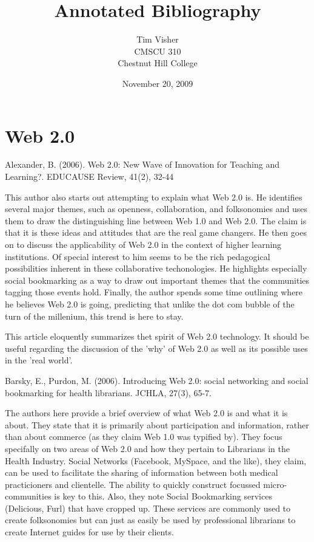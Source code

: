 \documentclass[12pt,oneside,letterpaper,titlepage]{article}
\author{Tim Visher\\ CMSCU 310\\ Chestnut Hill College}
\title{Annotated Bibliography}
\date{November 20, 2009}
\begin{document}
\maketitle

\section{Web 2.0}

Alexander, B. (2006). Web 2.0: New Wave of Innovation for Teaching and Learning?. EDUCAUSE Review, 41(2), 32-44

This author also starts out attempting to explain what Web 2.0 is.  He
identifies several major themes, such as openness, collaboration, and
folksonomies and uses them to draw the distinguishing line between Web 1.0 and
Web 2.0.  The claim is that it is these ideas and attitudes that are the real
game changers.  He then goes on to discuss the applicability of Web 2.0 in the
context of higher learning institutions.  Of special interest to him seems to be
the rich pedagogical possibilities inherent in these collaborative
techonologies.  He highlights especially social bookmarking as a way to draw out
important themes that the communities tagging those events hold.  Finally, the
author spends some time outlining where he believes Web 2.0 is going, predicting
that unlike the dot com bubble of the turn of the millenium, this trend is here
to stay.

This article eloquently summarizes thet spirit of Web 2.0 technology.  It should
be useful regarding the discussion of the 'why' of Web 2.0 as well as its
possible uses in the 'real world'.

Barsky, E., Purdon, M. (2006). Introducing Web 2.0: social networking and social bookmarking for health librarians. JCHLA, 27(3), 65-7.

The authors here provide a brief overview of what Web 2.0 is and what it is
about.  They state that it is primarily about participation and information,
rather than about commerce (as they claim Web 1.0 was typified by).  They focus
specifally on two areas of Web 2.0 and how they pertain to Librarians in the
Health Industry.  Social Networks (Facebook, MySpace, and the like), they claim,
can be used to facilitate the sharing of information between both medical
practicioners and clientelle.  The ability to quickly construct focussed
micro-communities is key to this.  Also, they note Social Bookmarking services
(Delicious, Furl) that have cropped up.  These services are commonly used to
create folksonomies but can just as easily be used by professional librarians to
create Internet guides for use by their clients.
\end{document}
